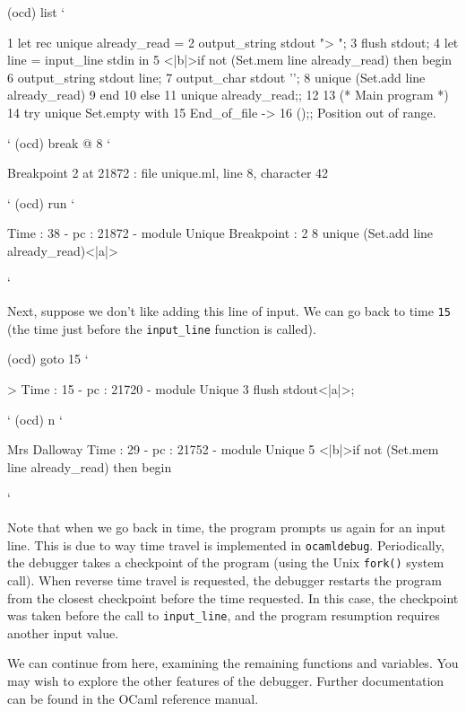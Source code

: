 \begin{ocamldebug}
(ocd) list
`
\begin{topoutput}
1 let rec unique already_read =
2    output_string stdout "> ";
3    flush stdout;
4    let line = input_line stdin in
5       <|b|>if not (Set.mem line already_read) then begin
6          output_string stdout line;
7          output_char stdout '\n';
8          unique (Set.add line already_read)
9       end
10       else
11          unique already_read;;
12
13 (* Main program *)
14 try unique Set.empty with
15    End_of_file ->
16       ();;
Position out of range.
\end{topoutput}
`
(ocd) break @ 8
`
\begin{topoutput}
Breakpoint 2 at 21872 : file unique.ml, line 8, character 42
\end{topoutput}
`
(ocd) run
`
\begin{topoutput}
Time : 38 - pc : 21872 - module Unique
Breakpoint : 2
8          unique (Set.add line already_read)<|a|>
\end{topoutput}
`
\end{ocamldebug}
%
Next, suppose we don't like adding this line of input. We can go back
to time \hbox{\lstinline/15/} (the time just before
the \hbox{\lstinline/input_line/} function is called).

\begin{ocamldebug}
(ocd) goto 15
`
\begin{topoutput}
> Time : 15 - pc : 21720 - module Unique
3    flush stdout<|a|>;
\end{topoutput}
`
(ocd) n
`
\begin{topoutput}
Mrs Dalloway
Time : 29 - pc : 21752 - module Unique
5       <|b|>if not (Set.mem line already_read) then begin
\end{topoutput}
`
\end{ocamldebug}
%
Note that when we go back in time, the program prompts us again for an
input line. This is due to way time travel is implemented
in \hbox{\lstinline/ocamldebug/}.  Periodically, the debugger takes a
checkpoint of the program (using the Unix \hbox{\lstinline/fork()/}
system call).  When reverse time travel is requested, the debugger
restarts the program from the closest checkpoint before the time
requested.  In this case, the checkpoint was taken before the call
to \hbox{\lstinline/input_line/}, and the program resumption requires
another input value.

We can continue from here, examining the remaining functions and
variables. You may wish to explore the other features of the
debugger.  Further documentation can be found in the OCaml reference
manual.
